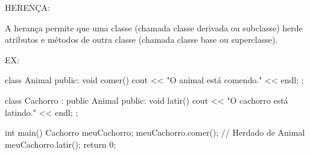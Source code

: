 HERENÇA:

A herança permite que uma classe (chamada classe derivada ou subclasse) 
herde atributos e métodos de outra classe (chamada classe base ou superclasse).

EX:

class Animal {
public:
    void comer() {
        cout << "O animal está comendo." << endl;
    }
};

class Cachorro : public Animal {
public:
    void latir() {
        cout << "O cachorro está latindo." << endl;
    }
};

int main() {
    Cachorro meuCachorro;
    meuCachorro.comer();  // Herdado de Animal
    meuCachorro.latir();
    return 0;
}